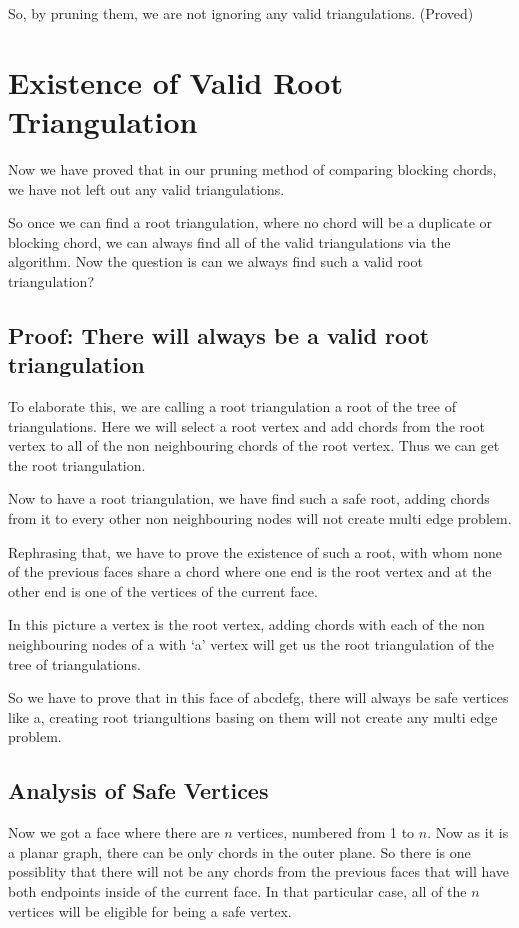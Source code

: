 \documentclass[12pt,a4paper]{article}
\begin{document}
So, by pruning them, we are not ignoring any valid triangulations. (Proved)

\section{Existence of Valid Root Triangulation}

Now we have proved that in our pruning method of comparing blocking chords, we have not left out any valid triangulations. 

So once we can find a root triangulation, where no chord will be a duplicate or blocking chord, we can always find all of the valid triangulations via the algorithm. Now the question is can we always find such a valid root triangulation?

\subsection{Proof: There will always be a valid root triangulation}

To elaborate this, we are calling a root triangulation a root of the tree of triangulations. Here we will select a root vertex and add chords from the root vertex to all of the non neighbouring chords of the root vertex. Thus we can get the root triangulation.

Now to have a root triangulation, we have find such a safe root, adding chords from it to every other non neighbouring nodes will not create multi edge problem.

Rephrasing that, we have to prove the existence of such a root, with whom none of the previous faces share a chord where one end is the root vertex and at the other end is one of the vertices of the current face.

In this picture a vertex is the root vertex, adding chords with each of the non neighbouring nodes of a with `a' vertex will get us the root triangulation of the tree of triangulations.

So we have to prove that in this face of abcdefg, there will always be safe vertices like a, creating root triangultions basing on them will not create any multi edge problem. 

\subsection{Analysis of Safe Vertices}

Now we got a face where there are $n$ vertices, numbered from 1 to $n$. Now as it is a planar graph, there can be only chords in the outer plane. So there is one possiblity that there will not be any chords from the previous faces that will have both endpoints inside of the current face. In that particular case, all of the $n$ vertices will be eligible for being a safe vertex.
\end{document}
